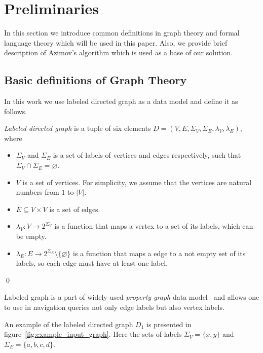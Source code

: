 \section{Preliminaries}

In this section we introduce common definitions in graph theory and formal language theory which will be used in this paper. 
Also, we provide brief description of Azimov's algorithm which is used as a base of our solution.

\subsection{Basic definitions of Graph Theory}

In this work we use labeled directed graph as a data model and define it as follows.
\begin{definition} \emph{Labeled directed graph} is a tuple of six elements $D = (V, E, \Sigma_V, \Sigma_E, \lambda_V, \lambda_E)$, where
\begin{itemize}
    \item $\Sigma_V$ and $\Sigma_E$ is a set of labels of vertices and edges respectively, such that $\Sigma_V \cap \Sigma_E = \varnothing$.
    \item $V$ is a set of vertices. For simplicity, we assume that the vertices are natural numbers from $1$ to $|V|$.
    \item $E \subseteq V \times V$ is a set of edges.
    \item $\lambda_V : V \xrightarrow{} 2^{\Sigma_V}$ is a function that maps a vertex to a set of its labels, which can be empty.
    \item $\lambda_E : E \xrightarrow{} 2^{\Sigma_E} \setminus \{\varnothing\}$ is a function that maps a edge to a not empty set of its labels, so each edge must have at least one label.
\end{itemize} \qed
\end{definition}

Labeled graph is a part of widely-used \textit{property graph} data model~\cite{Angles2018ThePG} and allows one to use in navigation queries not only edge labels but also vertex labels.

An example of the labeled directed graph $D_1$ is presented in figure~\ref{fig:example_input_graph}. Here the sets of labels $\Sigma_V = \{x, y\}$ and $\Sigma_E = \{a, b, c, d\}$.

